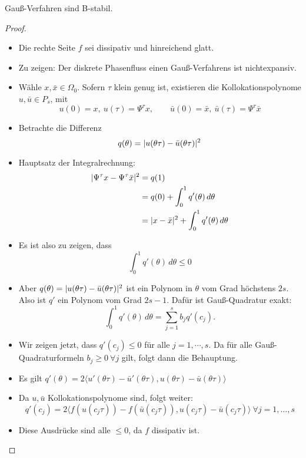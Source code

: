 \begin{satz}
	Gauß-Verfahren sind B-stabil.
\end{satz}
\begin{proof}
	\begin{itemize}
		\item Die rechte Seite $f$ sei dissipativ und hinreichend glatt.
		\item Zu zeigen: Der diskrete Phasenfluss einen Gauß-Verfahrens ist nichtexpansiv.
		\item Wähle $x,\bar x\in\Omega_0$. Sofern $\tau$ klein genug ist, existieren die Kollokationspolynome $u,\bar u\in P_s$, mit
			\begin{equation*}
				u(0)=x,\ u(\tau)=\Psi^\tau x,
				\qquad \bar u(0) = \bar x,\ \bar u(\tau) = \Psi^\tau \bar x
			\end{equation*}
		\item Betrachte die Differenz
			\begin{equation*}
				q(\theta) = \lvert u(\theta\tau)- \bar u(\theta\tau) \rvert^2
			\end{equation*}
		\item Hauptsatz der Integralrechnung:
			\begin{align*}
				\lvert \Psi^\tau x - \Psi^\tau \bar x \rvert^2 &= q(1) \\
				&= q(0) + \int_0^1 q'(\theta)\,d\theta \\
				&= \lvert  x-\bar x \rvert^2 + \int_0^1 q'(\theta)\,d\theta
			\end{align*}
		\item Es ist also zu zeigen, dass 
			\begin{equation*}
				\int_0^1 q'(\theta)\,d\theta \leq 0
			\end{equation*}
		 \item Aber $q(\theta) = \lvert u(\theta\tau)- \bar u(\theta\tau) \rvert^2$ ist ein Polynom in $\theta$ vom Grad höchstens $2s$. Also ist $q'$ ein Polynom vom Grad $2s-1$. Dafür ist Gauß-Quadratur exakt:
		 	\begin{equation*}
				\int_0^1 q'(\theta)\,d\theta = \sum_{j=1}^s b_j q'(c_j).
			\end{equation*}
		 \item Wir zeigen jetzt, dass $q'(c_j)\leq 0$ für alle $j=1,\cdots,s$. Da für alle Gauß-Quadraturformeln $b_j\geq 0\ \forall j$ gilt, folgt dann die Behauptung.
		 \item Es gilt $q'(\theta) = 2\langle u'(\theta\tau) - \bar u'(\theta\tau),u(\theta\tau) - \bar u(\theta\tau)\rangle$
		 \item Da $u,\bar u$ Kollokationspolynome sind, folgt weiter:
			 \begin{equation*}
			 	q'(c_j) = 2\langle f(u(c_j\tau)) - f(\bar u(c_j\tau)),u(c_j\tau) - \bar u(c_j\tau)\rangle\ \forall j=1,\hdots,s
			 \end{equation*}
		 \item Diese Ausdrücke sind alle $\leq 0$, da $f$ dissipativ ist. 
	\end{itemize}
\end{proof}

